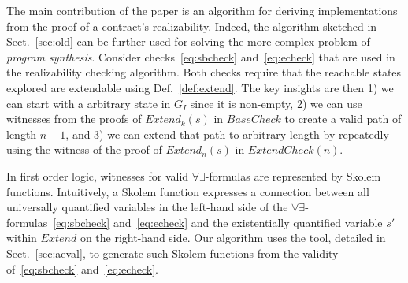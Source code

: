 The main contribution of the paper is an algorithm for deriving implementations from the proof of a contract's realizability.
Indeed, the algorithm sketched in Sect.~\ref{sec:old}
can be further used for solving the more complex problem of
\emph{program synthesis}. 
Consider checks~\eqref{eq:sbcheck}
and~\eqref{eq:echeck} that are used in the realizability checking
algorithm. Both checks require that the reachable states explored are
extendable using Def.~\ref{def:extend}. The key insights are then 1)
we can start with a arbitrary state in $G_I$ since it is non-empty, 2)
we can use witnesses from the proofs of $\mathit{Extend}_k(s)$ in
$\mathit{BaseCheck}$ to create a valid path of length $n-1$, and 3) we
can extend that path to arbitrary length by repeatedly using the
witness of the proof of $\mathit{Extend}_n(s)$ in
$\mathit{ExtendCheck}(n)$.

In first order logic, witnesses for valid $\forall\exists$-formulas
are represented by Skolem functions. Intuitively, a Skolem function
expresses a connection between all universally quantified variables in
the left-hand side of the $\forall\exists$-formulas~\eqref{eq:sbcheck}
and~\eqref{eq:echeck} and the existentially quantified variable $s'$
within $\mathit{Extend}$ on the right-hand side. Our algorithm uses
the \aeval tool, detailed in Sect.~\ref{sec:aeval}, to generate such
Skolem functions from the validity of~\eqref{eq:sbcheck}
and~\eqref{eq:echeck}.




